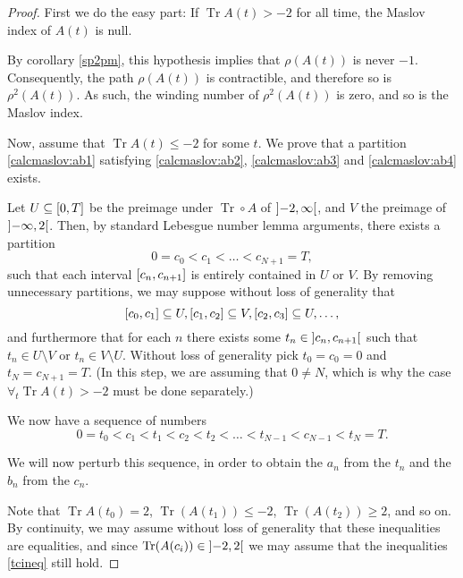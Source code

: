 \documentclass{article}
\theoremstyle{nonumberplain}
\newtheorem{proof}{Proof}
\DeclareMathOperator{\trace}{Tr}
\begin{document}
\begin{proof}
First we do the easy part: If $\trace A(t) > -2$ for all time, the Maslov index of $A(t)$ is null.

By corollary \ref{sp2pm}, this hypothesis implies that $\rho(A(t))$ is never $-1$. Consequently, the path $\rho(A(t))$ is contractible, and therefore so is $\rho^2(A(t))$. As such, the winding number of $\rho^2(A(t))$ is zero, and so is the Maslov index.

Now, assume that $\trace A(t) \leq -2$ for some $t$. We prove that a partition \eqref{calcmaslov:ab1} satisfying \ref{calcmaslov:ab2}, \ref{calcmaslov:ab3} and \ref{calcmaslov:ab4} exists.

Let $U \subseteq \interval 0 T$ be the preimage under $\trace \circ A$ of $\ointerval{-2}\infty$, and $V$ the preimage of $\ointerval{-\infty}2$. Then, by standard Lebesgue number lemma arguments, there exists a partition 
\begin{equation}
0 = c_0 < c_1 < \dots < c_{N+1} = T,
\end{equation}
such that each interval $\interval{c_n}{c_{n+1}}$ is entirely contained in $U$ or $V$. By removing unnecessary partitions, we may suppose without loss of generality that
\begin{equation}
\interval{c_0}{c_1} \subseteq U, \interval{c_1}{c_2} \subseteq V, \interval{c_2}{c_3} \subseteq U, \dots,
\end{equation}
and furthermore that for each $n$ there exists some $t_n \in \ointerval{c_n}{c_{n+1}}$ such that $t_n \in U \setminus V$ or $t_n \in V \setminus U$. Without loss of generality pick $t_0 = c_0 = 0$ and $t_N = c_{N+1} = T$. (In this step, we are assuming that $0 \neq N$, which is why the case $\forall_t \trace A(t) > -2$ must be done separately.)

We now have a sequence of numbers
\begin{equation}\label{tcineq}
0 = t_0 < c_1 < t_1 < c_2 < t_2 < \dots < t_{N-1} < c_{N-1} < t_{N} = T.
\end{equation}

We will now perturb this sequence, in order to obtain the $a_n$ from the $t_n$ and the $b_n$ from the $c_n$.

Note that $\trace A(t_0) = 2$, $\trace(A(t_1)) \leq -2$, $\trace(A(t_2)) \geq 2$, and so on. By continuity, we may assume without loss of generality that these inequalities are equalities, and since $\trace(A(c_i)) \in \ointerval{-2}2$ we may assume that the inequalities \eqref{tcineq} still hold.


\end{proof}
\end{document}
